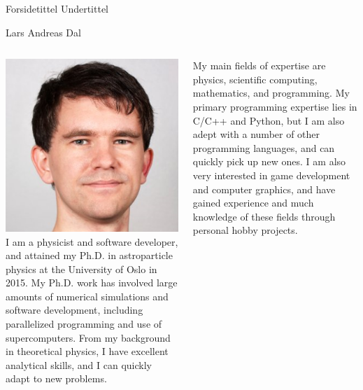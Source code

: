 \documentclass[norsk]{beamer}
\begin{document}
\begin{frame}{Forsidetittel}
  Undertittel
\end{frame}

\begin{frame}{Lars Andreas Dal}
  \begin{columns}
  \includegraphics[width=\textwidth]{../people/lars.png}
     \tiny
I am a physicist and software developer, and attained my Ph.D. in astroparticle physics at the University of Oslo in 2015. My Ph.D. work has involved large amounts of numerical simulations and software development, including parallelized programming and use of supercomputers. From my background in theoretical physics, I have excellent analytical skills, and I can quickly adapt to new problems.

My main fields of expertise are physics, scientific computing, mathematics, and programming. My primary programming expertise lies in C/C++ and Python, but I am also adept with a number of other programming languages, and can quickly pick up new ones. I am also very interested in game development and computer graphics, and have gained experience and much knowledge of these fields through personal hobby projects.
  \end{columns}
\end{frame}
\end{document}
